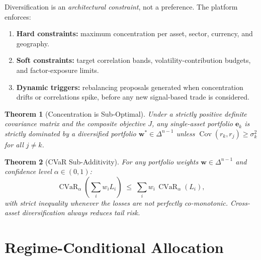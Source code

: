 \documentclass[12pt,openany]{book}
\newcommand{\bfw}{\mathbf{w}}
\newcommand{\bfe}{\mathbf{e}}
\DeclareMathOperator{\CVaR}{CVaR}
\DeclareMathOperator{\Cov}{Cov}
\numberwithin{equation}{chapter}
\theoremstyle{plain}
\newtheorem{theorem}{Theorem}[chapter]
\theoremstyle{definition}
\theoremstyle{remark}
\begin{document}
Diversification is an \emph{architectural constraint}, not a
preference.  The platform enforces:

\begin{enumerate}
  \item \textbf{Hard constraints:} maximum concentration per asset,
        sector, currency, and geography.
  \item \textbf{Soft constraints:} target correlation bands,
        volatility-contribution budgets, and factor-exposure limits.
  \item \textbf{Dynamic triggers:} rebalancing proposals generated
        when concentration drifts or correlations spike, before any
        new signal-based trade is considered.
\end{enumerate}

\begin{theorem}[Concentration is Sub-Optimal]
\label{thm:concentration-suboptimal}
Under a strictly positive definite covariance matrix and the
composite objective $J$, any single-asset portfolio
$\bfe_k$ is strictly dominated by a diversified portfolio
$\bfw^* \in \Delta^{n-1}$ unless $\Cov(r_k, r_j) \geq \sigma_k^2$
for all $j \neq k$.
\end{theorem}

\begin{theorem}[CVaR Sub-Additivity]
\label{thm:cvar-subadd}
For any portfolio weights $\bfw \in \Delta^{n-1}$ and
confidence level $\alpha \in (0,1)$:
\begin{equation}
  \CVaR_\alpha\!\left(\sum_i w_i L_i\right)
  \;\leq\;
  \sum_i w_i\,\CVaR_\alpha(L_i),
\end{equation}
with strict inequality whenever the losses are not perfectly
co-monotonic.  Cross-asset diversification always reduces tail risk.
\end{theorem}

\section{Regime-Conditional Allocation}
\end{document}
